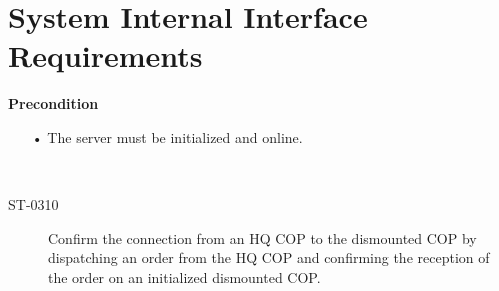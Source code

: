 \section{System Internal Interface Requirements}
\textbf{Precondition}
\begin{itemize}
  \item[•] The server must be initialized and online.
\end{itemize}
~\

\begin{description}
\item[ST-0310]	Confirm the connection from an HQ COP to the dismounted COP by dispatching an order from the HQ COP and confirming the reception of the order on an initialized dismounted COP.
\end{description}